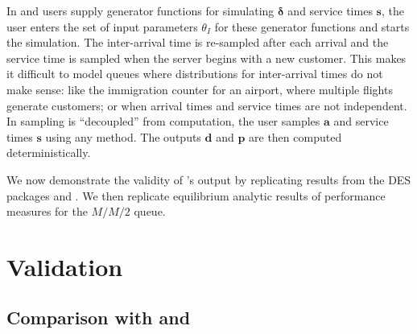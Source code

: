 \documentclass[article]{jss}
\begin{document}
In  and  users supply generator functions for
simulating $\boldsymbol{\delta}$ and service times $\mathbf{s}$, the user
enters the set of input parameters $\theta_I$ for these generator
functions and starts the simulation. The inter-arrival time is
re-sampled after each arrival and the service time is sampled when the
server begins with a new customer. This makes it difficult to model
queues where distributions for inter-arrival times do not make sense:
like the immigration counter for an airport, where multiple flights
generate customers; or when arrival times and service times are not
independent. In  sampling is ``decoupled'' from
computation, the user samples $\mathbf{a}$ and service times
$\mathbf{s}$ using any method. The outputs $\mathbf{d}$ and
$\mathbf{p}$ are then computed deterministically.

We now demonstrate the validity of 's output by replicating results from the DES packages  and . We then replicate equilibrium analytic results of performance measures for the $M/M/2$ queue. 

\section{Validation} \label{sec:Validation}

\subsection[Comparison with simmer and simpy]{Comparison with
   and }
\end{document}
